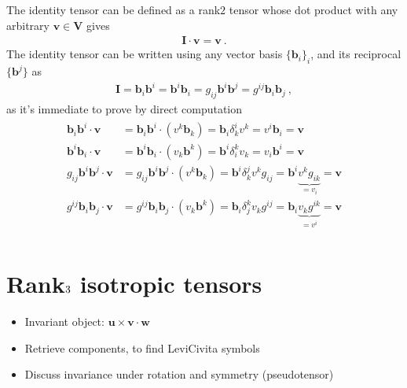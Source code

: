 \documentclass[letterpaper,10pt,english]{jupyterBook}
\begin{document}
\sphinxAtStartPar
The identity tensor can be defined as a rank\sphinxhyphen{}\(2\) tensor whose dot product with any arbitrary \(\mathbf{v} \in \mathbf{V}\) gives
\begin{equation*}
\begin{split}\mathbf{I} \cdot \mathbf{v} = \mathbf{v} \ .\end{split}
\end{equation*}
\sphinxAtStartPar
The identity tensor can be written using any vector basis \(\{ \mathbf{b}_i \}_i\), and its reciprocal \(\{ \mathbf{b}^j \}\) as
\begin{equation*}
\begin{split}\mathbf{I} = \mathbf{b}_i \mathbf{b}^i = \mathbf{b}^i \mathbf{b}_i = g_{ij} \mathbf{b}^i \mathbf{b}^j = g^{ij} \mathbf{b}_i \mathbf{b}_j \ ,\end{split}
\end{equation*}
\sphinxAtStartPar
as it’s immediate to prove by direct computation
\begin{equation*}
\begin{split}\begin{aligned}
  \mathbf{b}_i \mathbf{b}^i \cdot \mathbf{v} & = \mathbf{b}_i \mathbf{b}^i \cdot \left( v^k \mathbf{b}_k \right) = \mathbf{b}_i \delta^i_k v^k = v^i \mathbf{b}_i = \mathbf{v} \\
  \mathbf{b}^i \mathbf{b}_i \cdot \mathbf{v} & = \mathbf{b}^i \mathbf{b}_i \cdot \left( v_k \mathbf{b}^k \right) = \mathbf{b}^i \delta_i^k v_k = v_i \mathbf{b}^i = \mathbf{v} \\
  g_{ij} \mathbf{b}^i \mathbf{b}^j \cdot \mathbf{v} & = g_{ij} \mathbf{b}^i \mathbf{b}^j \cdot \left( v^k \mathbf{b}_k \right) = \mathbf{b}^i \delta^j_k v^k g_{ij} = \mathbf{b}^i \underbrace{v^k g_{ik}}_{=v_i} = \mathbf{v}  \\
  g^{ij} \mathbf{b}_i \mathbf{b}_j \cdot \mathbf{v} & = g^{ij} \mathbf{b}_i \mathbf{b}_j \cdot \left( v_k \mathbf{b}^k \right) = \mathbf{b}_i \delta_j^k v_k g^{ij} = \mathbf{b}_i \underbrace{v_k g^{ik}}_{=v^i} = \mathbf{v}  \\
\end{aligned}\end{split}
\end{equation*}

\section{Rank\sphinxhyphen{}\protect\(3\protect\) isotropic tensors}
\label{\detokenize{ch/tensor-algebra-calculus/algebra-isotropic-tensors:rank-3-isotropic-tensors}}
\sphinxAtStartPar
{}
\begin{itemize}
\item {} 
\sphinxAtStartPar
Invariant object: \(\mathbf{u} \times \mathbf{v} \cdot \mathbf{w}\)

\item {} 
\sphinxAtStartPar
Retrieve components, to find Levi\sphinxhyphen{}Civita symbols

\item {} 
\sphinxAtStartPar
Discuss invariance under rotation and symmetry (pseudo\sphinxhyphen{}tensor)

\end{itemize}
\end{document}
